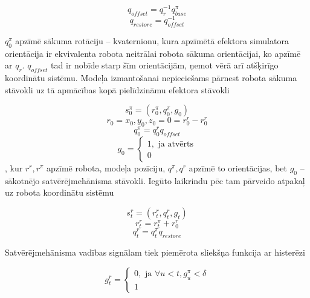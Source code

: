 \documentclass[12pt, a4paper]{article}
\numberwithin{equation}{section} %
\begin{document}
\begin{equation}
    q_{offset} = q_r^{-1}q^{\pi}_{base}
\end{equation}
\begin{equation}
    q_{restore} = q_{offset}^{-1}
\end{equation}

$q^{\pi}_0$ apzīmē sākuma rotāciju -- kvaternionu, kura apzīmētā efektora simulatora orientācija ir ekvivalenta robota neitrālai robota sākuma orientācijai, ko apzīmē ar $q_r$. $q_{offset}$ tad ir nobīde starp šīm orientācijām, ņemot vērā arī atšķirīgo koordinātu sistēmu. Modeļa izmantošanai nepieciešams pārnest robota sākuma stāvokli uz tā apmācības kopā pielīdzināmu efektora stāvokli

\begin{equation}
    s^{\pi}_0 = (r^{\pi}_0, q^{\pi}_0 , g_0)
\end{equation}
\begin{equation}
    r_0 = x_0, y_0, z_0 = 0 = r^r_0 - r^r_0
\end{equation}
\begin{equation}
    q^{\pi}_0 = q^{r}_0q_{offset}
\end{equation}
\begin{equation}
    g_0 = 
    \begin{cases}
        1, \text{ ja atvērts} \\
        0
    \end{cases}
\end{equation}
, kur $r^r, r^{\pi}$ apzīmē robota, modeļa pozīciju, $q^{\pi}, q^r$ apzīmē to orientācijas, bet $g_0$ -- sākotnējo satvērējmehānisma stāvokli. Iegūto laikrindu pēc tam pārveido atpakaļ uz robota koordinātu sistēmu 

\begin{equation}
    s^{r}_t = (r^r_t, q^r_t , g_t)
\end{equation}
\begin{equation}
    r^r_t = r^{\pi}_t + r^r_0
\end{equation}
\begin{equation}
    q^r_t = q^{\pi}_tq_{restore}
\end{equation}

Satvērējmehānisma vadības signālam tiek piemērota sliekšņa funkcija ar histerēzi

\begin{equation}
    g^r_t = 
    \begin{cases}
        0, \text{ ja } \forall u < t, g^{\pi}_u < \delta \\
        1
    \end{cases}
\end{equation}
\end{document}
